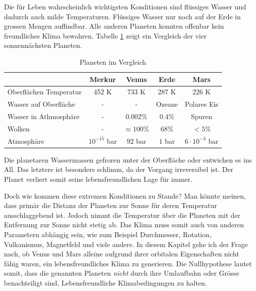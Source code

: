 \begin{refsection}
Die für Leben wahrscheinlich wichtigsten Konditionen sind flüssiges Wasser und dadurch auch milde Temperaturen. Flüssiges Wasser nur noch auf der Erde in grossen Mengen auffindbar.
Alle anderen Planeten konnten offenbar kein freundliches Klima bewahren. Tabelle \ref{planeten_comparison} zeigt ein Vergleich der vier sonnennächsten Planeten.
\begin{center}
\begin{table}
	\center
	\begin{tabular}{l|c c c c}
							& Merkur			& Venus				& Erde		& Mars                  \\
  \hline
  Oberflächen Temperatur	& 452 K				& 733 K				& 287 K		& 226 K                 \\
  Wasser auf Oberfläche		& -					& -					& Ozeane	& Polares Eis			\\
  Wasser in Athmosphäre		& -					& $0.002\%$ 		& $0.4\%$	& Spuren				\\
  Wolken					& -					& $\approx100\%$	& $68\%$  	& $<5\%$                \\
  Atmosphäre				& $10^{-15}$ bar	& $92$ bar			& $1$ bar	& $6 \cdot 10^{-3}$ bar 
\end{tabular}
\caption{Planeten im Vergleich}
\label{planeten_comparison}
\end{table}
\end{center}
Die planetaren Wassermassen gefroren unter der Oberfläche oder entwichen es ins All. Das letztere ist besonders schlimm, da der Vorgang irreversibel ist. Der Planet verliert somit seine lebensfreundlichen Lage für immer.

Doch wie kommen diese extremen Konditionen zu Stande? Man könnte meinen, dass primär die Distanz der Planeten zur Sonne für deren Temperatur ausschlaggebend ist. Jedoch nimmt die Temperatur über die Planeten mit der Entfernung zur Sonne nicht stetig ab.
Das Klima muss somit auch von anderen Parametern abhängig sein, wie zum Beispiel Durchmesser, Rotation, Vulkanismus, Magnetfeld und viele andere.
In diesem Kapitel gehe ich der Frage nach, ob Venus und Mars alleine aufgrund ihrer orbitalen Eigenschaften nicht fähig waren, ein lebensfreundliches Klima zu generieren. Die Nullhypothese lautet somit, dass die genannten Planeten \textit{nicht} durch ihre Umlaufbahn oder Grösse benachteiligt sind, Lebensfreundliche Klimabedingungen zu halten.


\end{refsection}
